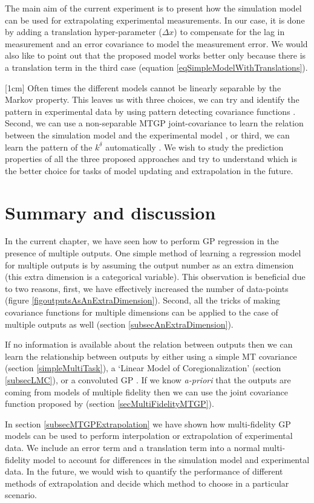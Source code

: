 The main aim of the current experiment is to present how the simulation model can be used for extrapolating experimental measurements. In our case, it is done by adding a translation hyper-parameter ($\Delta x$) to compensate for the lag in measurement and an error covariance to model the measurement error. We would also like to point out that the proposed model works better only because there is a translation term in the third case (equation \ref{eqSimpleModelWithTranslations}). 

[1cm]
Often times the different models cannot be linearly separable by the Markov property. This leaves us with three choices, we can try and identify the pattern in experimental data by using pattern detecting covariance functions \cite{wilson2014thesis}. Second, we can use a non-separable MTGP joint-covariance to learn the relation between the simulation model and the experimental model \cite{alvarez2011kernels}, or third, we can learn the pattern of the $k^\delta$ automatically \cite{duvenaud2013structure}. We wish to study the prediction properties of all the three proposed approaches and try to understand which is the better choice for tasks of model updating and extrapolation in the future.


\section{Summary and discussion}
In the current chapter, we have seen how to perform GP regression in the presence of multiple outputs. One simple method of learning a regression model for multiple outputs is by assuming the output number as an extra dimension (this extra dimension is a categorical variable). This observation is beneficial due to two reasons, first, we have effectively increased the number of data-points (figure \ref{figoutputsAsAnExtraDimension}). Second, all the tricks of making covariance functions for multiple dimensions can be applied to the case of multiple outputs as well (section \ref{subsecAnExtraDimension}). 

If no information is available about the relation between outputs then we can learn the relationship between outputs by either using a simple MT covariance (section \ref{simpleMultiTask}), a `Linear Model of Coregionalization' (section \ref{subsecLMC}), or a convoluted GP \cite{alvarez2011kernels}. If we know \textit{a-priori} that the outputs are coming from models of multiple fidelity then we can use the joint covariance function proposed by  \cite{kennedy2000predicting} (section \ref{secMultiFidelityMTGP}). 

In section \ref{subsecMTGPExtrapolation} we have shown how multi-fidelity GP models can be used to perform interpolation or extrapolation of experimental data. We include an error term and a translation term into a normal multi-fidelity model to account for differences in the simulation model and experimental data. In the future, we would wish to quantify the performance of different methods of extrapolation and decide which method to choose in a particular scenario.
